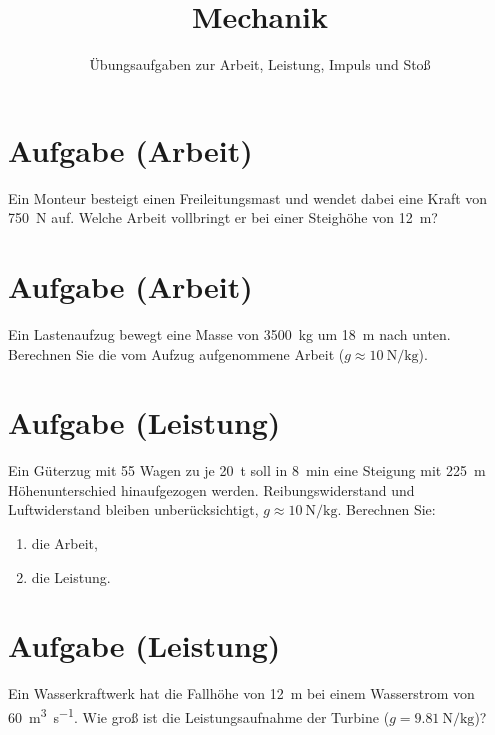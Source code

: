 \documentclass[12pt,oneside]{scrartcl}
\begin{document}
\sffamily

\title{Mechanik}
\subtitle{Übungsaufgaben zur Arbeit, Leistung, Impuls und Stoß}
\date{}
\maketitle

\section{Aufgabe (Arbeit)}
	Ein Monteur besteigt einen Freileitungsmast und wendet dabei eine Kraft von \SI{750}{\newton} auf. Welche Arbeit vollbringt er bei einer Steighöhe von \SI{12}{\meter}?\\
	
\section{Aufgabe (Arbeit)}
	Ein Lastenaufzug bewegt eine Masse von \SI{3500}{\kilogram} um \SI{18}{\meter} nach unten. Berechnen Sie die vom Aufzug aufgenommene Arbeit ($g\approx\SI{10}{\newton\per\kilogram}$).\\

\section{Aufgabe (Leistung)}
	Ein Güterzug mit 55 Wagen zu je \SI{20}{\tonne} soll in \SI{8}{\minute} eine Steigung mit \SI{225}{\meter} Höhenunterschied hinaufgezogen werden. Reibungswiderstand und Luftwiderstand bleiben unberücksichtigt, $g\approx\SI{10}{\newton\per\kilogram}$. Berechnen Sie:
	\begin{enumerate}
	\item die Arbeit,
	\item die Leistung.
	\end{enumerate}

\section{Aufgabe (Leistung)}
	Ein Wasserkraftwerk hat die Fallhöhe von \SI{12}{\meter} bei einem Wasserstrom von \SI{60}{\cubic\meter\per\second}. Wie groß ist die Leistungsaufnahme der Turbine ($g=\SI{9,81}{\newton\per\kilogram}$)?\\
	
\end{document}

